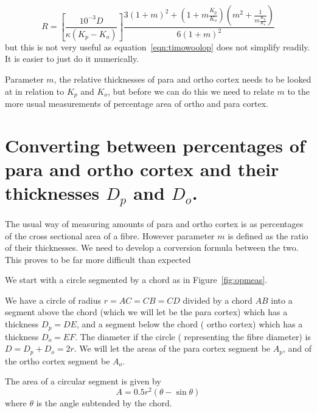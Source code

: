 \documentclass[titlepage]{article}  %
\begin{document}
\begin{equation}
\label{eqn:timowoolop}
R = \left[ \frac{10^{-3}D}{\kappa (K_{p} - K_{o})} \right] \frac{ 3(1+m)^{2}+(1+m \frac{K_{p}}{K_{o}})(m^{2}+\frac{1}{m \frac{K_{p}}{K_{o}}})} {6(1+m)^{2}}
\end{equation}
but this is not very useful as equation~\ref{eqn:timowoolop} does not simplify
readily. It is easier to just do it numerically.

Parameter $m$, the relative thicknesses of para and ortho cortex needs to be looked at in relation to $K_{p}$ and $K_{o}$, but before we can do this we need to relate $m$ to the more usual measurements of percentage area of ortho and para cortex.



\section{Converting between percentages of para and ortho cortex and their thicknesses $D_{p}$ and $D_{o}$.}
The usual way of measuring amounts of para and ortho cortex is as percentages of the cross sectional area of a fibre. However parameter $m$ is defined as the ratio of their thicknesses. We need to develop a corversion formula between the two. This proves to be far more difficult than expected

We start with a circle segmented by a chord as in Figure~\ref{fig:opmeas}.

We have a circle of radius $r = AC = CB = CD$ divided by a chord $AB$ into a segment above the chord (which we will let be the para cortex) which has a thickness $D_{p} = DE$, and a segment below the chord ( ortho cortex) which has a thickness $D_{o} = EF$. The diameter if the circle ( representing the fibre diameter) is $D = D_{p} + D_{o} = 2r$. We will let the areas of the para cortex segment be $A_{p}$, and of the ortho cortex segment be $A_{o}$.

The area of a circular segment is given by 
\begin{displaymath}
A = 0.5 r^{2} ( \theta - \sin \theta)
\end{displaymath}
where $\theta$ is the angle subtended by the chord.
\end{document}
